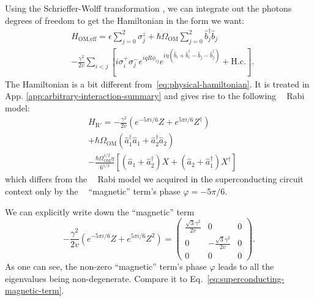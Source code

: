 \documentclass[reprint, aps, prx, amsmath, amssymb, longbibliography, superscriptaddress]{revtex4-2}
\DeclareMathOperator{\Zthree}{\mathbb{Z}_3}
\begin{document}
Using the Schrieffer-Wolff transformation \cite{bravyi_schrieffer_2011}, we can integrate out the photons degrees of freedom to get the Hamiltonian in the form we want:
\begin{equation}
\label{eq:optomechanical-transformed-qb-ring}
\begin{aligned}
&H_{\text{OM,eff}}=  \epsilon \sum_{j=0}^2 \sigma_j^z + \hbar \Omega_{\text{OM}} \sum_{j=0}^2 \hat{b}_j^{\dagger} \hat{b}_j \\
& -\frac{\gamma^2}{2v} \sum_{i<j}\left[i \sigma_i^{+} \sigma_j^- e^{i q R \phi_{i j}} e^{i \eta\left(\hat{b}_i+\hat{b}_i^{\dagger}-\hat{b}_j-\hat{b}_j^{\dagger}\right)}+\mathrm{H.c.}\right].
\end{aligned}
\end{equation}
The Hamiltonian is a bit different from~\eqref{eq:physical-hamiltonian}. It is treated in App. \ref{app:arbitrary-interaction-summary} and gives rise to the following $\Zthree$ Rabi model:
\begin{equation}
\label{eq:optomechanical-rabi}
\begin{aligned}
    &H_{\text{R}'}= - \frac{\gamma^2}{2v} (e^{-5\pi i/6} Z + e^{5\pi i/6} Z^{\dagger}) \\
    &+ \hbar \Omega_{\text{OM}} (\hat a_1^{\dagger} \hat a_1 + \hat a_2^{\dagger} \hat a_2) \\
    &- \frac{\hbar \Omega_{\text{OM}}^{1/2} \eta}{6^{1/2}}\left[(\hat a_1 + \hat a_2^{\dagger}) X  + (\hat a_2 + \hat a_1^{\dagger}) X^{\dagger}  \right]
\end{aligned}
\end{equation}
which differs from the $\Zthree $ Rabi model we acquired in the superconducting circuit context only by the $\Zthree$ ``magnetic'' term's phase $\varphi = - 5\pi/6$.

We can explicitly write down the ``magnetic'' term
\begin{equation}
\label{eq:optomechanical-magnetic-term}
    - \frac{\gamma^2}{2v} (e^{-5\pi i/6} Z + e^{5\pi i/6} Z^2) = \begin{pmatrix}
        \frac{\sqrt{3}\gamma^2}{2v} & 0 & 0 \\ 0 & -\frac{\sqrt{3}\gamma^2}{2v} & 0 \\ 0 & 0 & 0 
    \end{pmatrix}.
\end{equation}
As one can see, the non-zero ``magnetic'' term's phase $\varphi$ leads to all the eigenvalues being non-degenerate. Compare it to Eq.~\eqref{eq:superconducting-magnetic-term}.
\end{document}
